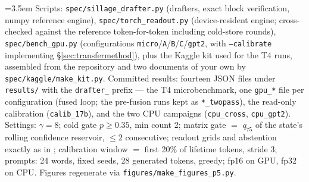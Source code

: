 \documentclass[11pt]{article}
\begin{document}
\begingroup\emergencystretch=3.5em
Scripts: \texttt{spec/sillage\_drafter.py} (drafters, exact block verification, numpy reference engine), \texttt{spec/torch\_readout.py} (device-resident engine; cross-checked against the reference token-for-token including cold-store rounds), \texttt{spec/bench\_gpu.py} (configurations \texttt{micro}/\texttt{A}/\texttt{B}/\texttt{C}/\texttt{gpt2}, with \texttt{--calibrate} implementing \S\ref{sec:transfermethod}), plus the Kaggle kit used for the T4 runs, assembled from the repository and two documents of your own by \texttt{spec/kaggle/make\_kit.py}. Committed results: fourteen JSON files under \texttt{results/} with the \texttt{drafter\_} prefix --- the T4 microbenchmark, one \texttt{gpu\_*} file per configuration (fused loop; the pre-fusion runs kept as \texttt{*\_twopass}), the read-only calibration (\texttt{calib\_17b}), and the two CPU campaigns (\texttt{cpu\_cross}, \texttt{cpu\_gpt2}). Settings: $\gamma = 8$; cold gate $p \ge 0.35$, min count 2; matrix gate $=$ $q_{75}$ of the state's rolling confidence reservoir, $\le 2$ consecutive; readout grids and abstention exactly as in \cite{sillage}; calibration window $=$ first 20\% of lifetime tokens, stride 3; prompts: 24 words, fixed seeds, 28 generated tokens, greedy; fp16 on GPU, fp32 on CPU. Figures regenerate via \texttt{figures/make\_figures\_p5.py}.\par\endgroup
\end{document}
